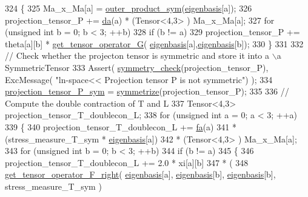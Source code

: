 \begin{DoxyCode}
324      \{
325         Ma\_x\_Ma[a] = \hyperlink{functions_8h_aa5f33021df9244e49e86b17b15286fa1}{outer\_product\_sym}(\hyperlink{classln__space_a1e67221edabbd2db69aa4a21262bd1f4}{eigenbasis}[a]);
326         projection\_tensor\_P += \hyperlink{classln__space_a8d65915eb5122e3c5941b7163af57306}{da}(a) * (Tensor<4,3> ) Ma\_x\_Ma[a];
327         \textcolor{keywordflow}{for} (\textcolor{keywordtype}{unsigned} \textcolor{keywordtype}{int} b = 0; b < 3; ++b)
328             \textcolor{keywordflow}{if} (b != a)
329                 projection\_tensor\_P += theta[a][b] * \hyperlink{functions_8h_a6e649771188b6d625bea6309e77fbd16}{get\_tensor\_operator\_G}(
      \hyperlink{classln__space_a1e67221edabbd2db69aa4a21262bd1f4}{eigenbasis}[a],\hyperlink{classln__space_a1e67221edabbd2db69aa4a21262bd1f4}{eigenbasis}[b]);
330      \}
331 
332     \textcolor{comment}{// Check whether the projecton tensor is symmetric and store it into a \(\backslash\)a SymmetricTensor}
333      Assert( \hyperlink{functions_8h_aa37f13547b984cb066e2fcb530b36425}{symmetry\_check}(projection\_tensor\_P), ExcMessage( \textcolor{stringliteral}{"ln-space<< Projection tensor P
       is not symmetric"}) );
334      \hyperlink{classln__space_a514a44d8b96a0cffeab11d39933299b5}{projection\_tensor\_P\_sym} = \hyperlink{functions_8h_afe83e9509497294b7f662b800b6b91ff}{symmetrize}(projection\_tensor\_P);
335 
336     \textcolor{comment}{// Compute the double contraction of T and L}
337      Tensor<4,3> projection\_tensor\_T\_doublecon\_L;
338      \textcolor{keywordflow}{for} (\textcolor{keywordtype}{unsigned} \textcolor{keywordtype}{int} a = 0; a < 3; ++a)
339      \{
340         projection\_tensor\_T\_doublecon\_L += \hyperlink{classln__space_aff1eab9675707d7aeed154aadb11adf4}{fa}(a)
341                                            * (stress\_measure\_T\_sym * \hyperlink{classln__space_a1e67221edabbd2db69aa4a21262bd1f4}{eigenbasis}[a])
342                                            * (Tensor<4,3> ) Ma\_x\_Ma[a];
343         \textcolor{keywordflow}{for} (\textcolor{keywordtype}{unsigned} \textcolor{keywordtype}{int} b = 0; b < 3; ++b)
344             \textcolor{keywordflow}{if} (b != a)
345             \{
346                 projection\_tensor\_T\_doublecon\_L += 2.0 * xi[a][b]
347                                                    * (
348                                                         
      \hyperlink{functions_8h_acfd8da38df3766246f7bcf0e736ad9f4}{get\_tensor\_operator\_F\_right}( \hyperlink{classln__space_a1e67221edabbd2db69aa4a21262bd1f4}{eigenbasis}[a], 
      \hyperlink{classln__space_a1e67221edabbd2db69aa4a21262bd1f4}{eigenbasis}[b], \hyperlink{classln__space_a1e67221edabbd2db69aa4a21262bd1f4}{eigenbasis}[b], stress\_measure\_T\_sym )

\end{DoxyCode}
